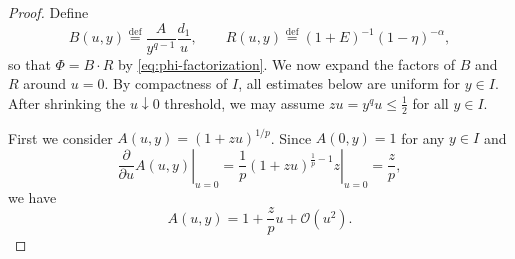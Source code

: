 \documentclass{article}
\newcommand{\defi}{\stackrel{\mathrm{\scriptscriptstyle def}}{=}}
\begin{document}
\begin{proof}
    Define
    \[
        B(u,y)\defi \frac{A}{y^{q-1}}\frac{d_1}{u},
        \qquad
        R(u,y)\defi (1+E)^{-1}(1-\eta)^{-\alpha},
    \]
    so that $\Phi=B\cdot R$ by \eqref{eq:phi-factorization}.
    We now expand the factors of $B$ and $R$ around $u=0$. By compactness of $I$,
    all estimates below are uniform for $y\in I$.
    After shrinking the $u \downarrow 0$ threshold, we may assume $zu=y^q u \leq \frac12$ for all $y \in I$.

    First we consider $A(u,y) = (1+zu)^{1/p}$.
    Since $A(0,y) = 1$ for any $y \in I$ and
    \begin{equation}
        \left.\frac{\partial }{\partial u} A(u,y)\right|_{u=0}
        = \left.\frac{1}{p} (1+zu)^{\frac 1p -1}z\right|_{u=0}
        = \frac{z}{p},
        \label{eq:A-deriv-1}
    \end{equation}
    we have
    \begin{equation}
        \label{eq:A-u-expand}
        A(u,y) = 1 + \frac{z}{p} u + \mathcal{O}(u^2).
    \end{equation}


\end{proof}
\end{document}
